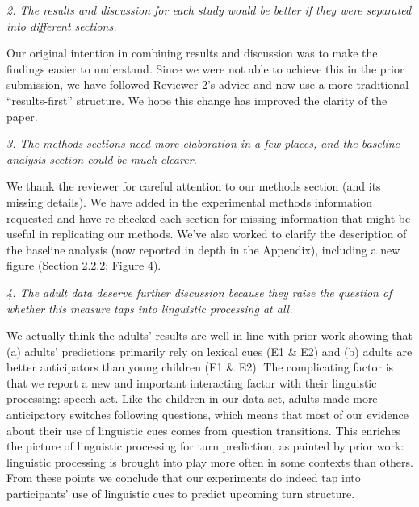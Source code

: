 \documentclass[11pt,a4paper]{letter} %
\begin{document}
\begin{letter}{}
\smallskip

\noindent \textit{2. The results and discussion for each study would be better if they were separated into different sections.}

\noindent Our original intention in combining results and discussion was to make the findings easier to understand. Since we were not able to achieve this in the prior submission, we have followed Reviewer 2's advice and now use a more traditional ``results-first'' structure. We hope this change has improved the clarity of the paper. 

\smallskip

\noindent \textit{3. The methods sections need more elaboration in a few places, and the baseline analysis section could be much clearer.}

\noindent We thank the reviewer for careful attention to our methods section (and its missing details). We have added in the experimental methods information requested and have re-checked each section for missing information that might be useful in replicating our methods. We've also worked to clarify the description of the baseline analysis (now reported in depth in the Appendix), including a new figure (Section 2.2.2; Figure 4). 

\smallskip

\noindent \textit{4. The adult data deserve further discussion because they raise the question of whether this measure taps into linguistic processing at all.}

\noindent We actually think the adults' results are well in-line with prior work showing that (a) adults' predictions primarily rely on lexical cues (E1 \& E2) and (b) adults are better anticipators than young children (E1 \& E2). The complicating factor is that we report a new and important interacting factor with their linguistic processing: speech act. Like the children in our data set, adults made more anticipatory switches following questions, which means that most of our evidence about their use of linguistic cues comes from question transitions. This enriches the picture of linguistic processing for turn prediction, as painted by prior work: linguistic processing is brought into play more often in some contexts than others. From these points we conclude that our experiments do indeed tap into participants' use of linguistic cues to predict upcoming turn structure.


\end{letter}
\end{document}
